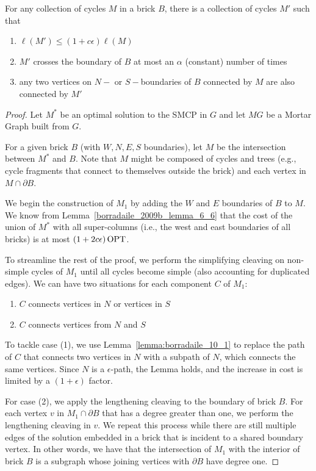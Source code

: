 \begin{corollary}\label{bateni_4_1_multicycle}
For any collection of cycles \(M\) in a brick \(B\), there is a collection of cycles \(M'\) such that
\begin{enumerate}
    \item \(\ell(M') \leq (1 + c \epsilon)\ell(M)\)
    \item \(M'\) crosses the boundary of \(B\) at most an \(\alpha\) (constant) number of times
    \item any two vertices on \(N-\) or \(S-\)boundaries of \(B\) connected by \(M\) are also connected by \(M'\)
\end{enumerate}
\end{corollary}
\begin{proof}
    Let \(M^\ast\) be an optimal solution to the SMCP in \(G\) and let \(MG\) be a Mortar Graph built from \(G\). 

    For a given brick \(B\) (with \(W, N, E, S\) boundaries), let \(M\) be the intersection between \(M^\ast\) and \(B\). Note that \(M\) might be composed of cycles and trees (e.g., cycle fragments that connect to themselves outside the brick) and each vertex in \(M \cap \partial B\).

    We begin the construction of \(M_1\) by adding the \(W\) and \(E\) boundaries of \(B\) to \(M\). We know from Lemma~\ref{borradaile_2009b_lemma_6_6} that the cost of the union of \(M^\ast\) with all super-columns (i.e., the west and east boundaries of all bricks) is at most \((1 + 2 c \epsilon) \operatorname{\textrm{OPT}}\).

    To streamline the rest of the proof, we perform the simplifying cleaving on non-simple cycles of \(M_1\) until all cycles become simple (also accounting for duplicated edges).
    We can have two situations for each component \(C\) of \(M_1\):
    \begin{enumerate}
        \item \(C\) connects vertices in \(N\) or vertices in \(S\)
        \item \(C\) connects vertices from \(N\) and \(S\)
    \end{enumerate}

    To tackle case (1), we use Lemma~\ref{lemma:borradaile_10_1} to replace the path of \(C\) that connects two vertices in \(N\) with a subpath of \(N\), which connects the same vertices. Since \(N\) is a \(\epsilon\)-path, the Lemma holds, and the increase in cost is limited by a \((1 + \epsilon)\) factor.

    For case (2), we apply the lengthening cleaving to the boundary of brick \(B\). For each vertex \(v\) in \(M_1 \cap \partial B\) that has a degree greater than one, we perform the lengthening cleaving in \(v\). We repeat this process while there are still multiple edges of the solution embedded in a brick that is incident to a shared boundary vertex. In other words, we have that the intersection of \(M_1\) with the interior of brick \(B\) is a subgraph whose joining vertices with \(\partial B\) have degree one.



\end{proof}
